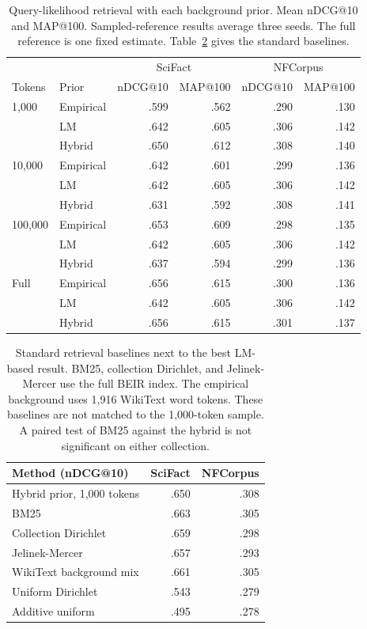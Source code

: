 \documentclass[11pt]{article}
\begin{document}
\begin{table}[t]
\centering
\small
\begin{tabular}{llrrrr}
\toprule
 & & \multicolumn{2}{c}{SciFact} & \multicolumn{2}{c}{NFCorpus} \\
Tokens & Prior & nDCG@10 & MAP@100 & nDCG@10 & MAP@100 \\
\midrule
1,000 & Empirical & .599 & .562 & .290 & .130 \\
      & LM         & .642 & .605 & .306 & .142 \\
      & Hybrid     & .650 & .612 & .308 & .140 \\
10,000 & Empirical & .642 & .601 & .299 & .136 \\
       & LM         & .642 & .605 & .306 & .142 \\
       & Hybrid     & .631 & .592 & .308 & .141 \\
100,000 & Empirical & .653 & .609 & .298 & .135 \\
        & LM         & .642 & .605 & .306 & .142 \\
        & Hybrid     & .637 & .594 & .299 & .136 \\
Full & Empirical & .656 & .615 & .300 & .136 \\
     & LM         & .642 & .605 & .306 & .142 \\
     & Hybrid     & .656 & .615 & .301 & .137 \\
\bottomrule
\end{tabular}
\caption{Query-likelihood retrieval with each background prior. Mean nDCG@10
and MAP@100. Sampled-reference results average three seeds. The full reference
is one fixed estimate. Table~\ref{tab:retrieval-controls} gives the standard
baselines.}
\label{tab:retrieval}
\end{table}

\begin{table}[t]
\centering
\small
\begin{tabular}{lrr}
\toprule
Method (nDCG@10) & SciFact & NFCorpus \\
\midrule
Hybrid prior, 1,000 tokens & .650 & .308 \\
\midrule
BM25 & .663 & .305 \\
Collection Dirichlet & .659 & .298 \\
Jelinek-Mercer & .657 & .293 \\
WikiText background mix & .661 & .305 \\
Uniform Dirichlet & .543 & .279 \\
Additive uniform & .495 & .278 \\
\bottomrule
\end{tabular}
\caption{Standard retrieval baselines next to the best LM-based result. BM25,
collection Dirichlet, and Jelinek-Mercer use the full BEIR index. The
empirical background uses 1,916 WikiText word tokens. These baselines are not
matched to the 1,000-token sample. A paired test of BM25 against the hybrid
is not significant on either collection.}
\label{tab:retrieval-controls}
\end{table}
\end{document}
